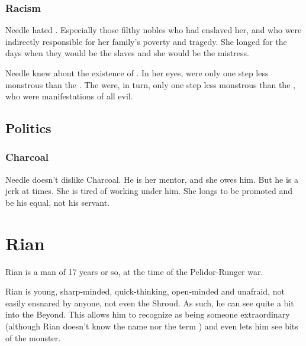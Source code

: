 \subsubsection{Racism}
Needle hated \scathae. 
Especially those filthy nobles who had enslaved her, and who were indirectly responsible for her family's poverty and tragedy. 
She longed for the days when they would be the slaves and she would be the mistress. 

Needle knew about the existence of \quiljaaran \serpentmen. 
In her eyes, \scathae were only one step less monstrous than the \serpentmen. 
The \serpentmen were, in turn, only one step less monstrous than the \dragons, who were manifestations of all evil. 









\subsection{Politics}
\subsubsection{Charcoal}
Needle doesn't dislike Charcoal. 
He is her mentor, and she owes him. 
But he is a jerk at times. 
She is tired of working under him. 
She longs to be promoted and be his equal, not his servant. 















\section{Rian}
Rian is a \human{} man of 17 years or so, at the time of the Pelidor-Runger war. 

Rian is young, sharp-minded, quick-thinking, open-minded and unafraid, not easily ensnared by anyone, not even the Shroud. As such, he can see quite a bit into the Beyond. This allows him to recognize \Ishnaruchaefir{} as being someone extraordinary (although Rian doesn't know the name \quo{\Ishnaruchaefir} nor the term \quo{\vertex}) and even lets him see bits of the  monster. 

